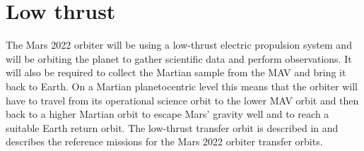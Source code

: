 %
% 
% 




\section{Low thrust}
\label{sec:lowthrustorb}
The Mars 2022 orbiter will be using a low-thrust electric propulsion system and will be orbiting the planet to gather scientific data and perform observations. It will also be required to collect the Martian sample from the \ac{MAV} and bring it back to Earth. On a Martian planetocentric level this means that the orbiter will have to travel from its operational science orbit to the lower \ac{MAV} orbit and then back to a higher Martian orbit to escape Mars' gravity well and to reach a suitable Earth return orbit. The low-thrust transfer orbit is described in  and  describes the reference missions for the Mars 2022 orbiter transfer orbits.

%



